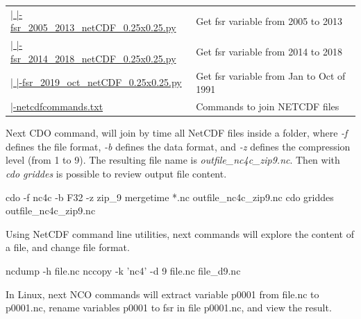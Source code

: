 \documentclass[12pt,twoside]{reedthesis}
\newenvironment{Shaded}{\begin{snugshade}}{\end{snugshade}}
\newcommand{\ExtensionTok}[1]{#1}
\newcommand{\NormalTok}[1]{#1}
\newcommand{\StringTok}[1]{\textcolor[rgb]{0.31,0.60,0.02}{#1}}
\begin{document}
\begin{longtable}[t]{>{\raggedright\arraybackslash}p{2.3in}>{\raggedright\arraybackslash}p{3in}}
\href{ftp://ftp.geocorp.co/windthesis/downloadingEra5/fsr/fsr_2005_2013_netCDF_0.25x0.25.py}{  |    |-fsr\_2005\_2013\_netCDF\_0.25x0.25.py} & Get fsr variable from 2005 to 2013\\
\href{ftp://ftp.geocorp.co/windthesis/downloadingEra5/fsr/fsr_2014_2018_netCDF_0.25x0.25.py}{  |    |-fsr\_2014\_2018\_netCDF\_0.25x0.25.py} & Get fsr variable from 2014 to 2018\\
\href{ftp://ftp.geocorp.co/windthesis/downloadingEra5/fsr/fsr_2019_oct_netCDF_0.25x0.25.py}{  |    |-fsr\_2019\_oct\_netCDF\_0.25x0.25.py} & Get fsr variable from Jan to Oct of 1991\\
\href{ftp://ftp.geocorp.co/windthesis/downloadingEra5/netcdfcommands.txt}{  |-netcdfcommands.txt} & Commands to join NETCDF files\\
\bottomrule
\end{longtable}
\endgroup{}

Next CDO command, will join by time all NetCDF files inside a folder, where \emph{-f} defines the file format, \emph{-b} defines the data format, and \emph{-z} defines the compression level (from 1 to 9). The resulting file name is \emph{outfile\_nc4c\_zip9.nc}. Then with \emph{cdo griddes} is possible to review output file content.

\scriptsize

\vspace{0.4cm}
\begin{Shaded}
\begin{Highlighting}[]
      \ExtensionTok{cdo}\NormalTok{ -f nc4c -b F32 -z zip_9 mergetime *.nc outfile_nc4c_zip9.nc}
      \ExtensionTok{cdo}\NormalTok{ griddes outfile_nc4c_zip9.nc}
\end{Highlighting}
\end{Shaded}
\normalsize

Using NetCDF command line utilities, next commands will explore the content of a file, and change file format.

\scriptsize

\vspace{0.4cm}
\begin{Shaded}
\begin{Highlighting}[]
      \ExtensionTok{ncdump}\NormalTok{ -h file.nc}
      \ExtensionTok{nccopy}\NormalTok{ -k }\StringTok{'nc4'}\NormalTok{ -d 9 file.nc file_d9.nc}
\end{Highlighting}
\end{Shaded}
\normalsize

In Linux, next NCO commands will extract variable p0001 from file.nc to p0001.nc, rename variables p0001 to fsr in file p0001.nc, and view the result.
\end{document}
